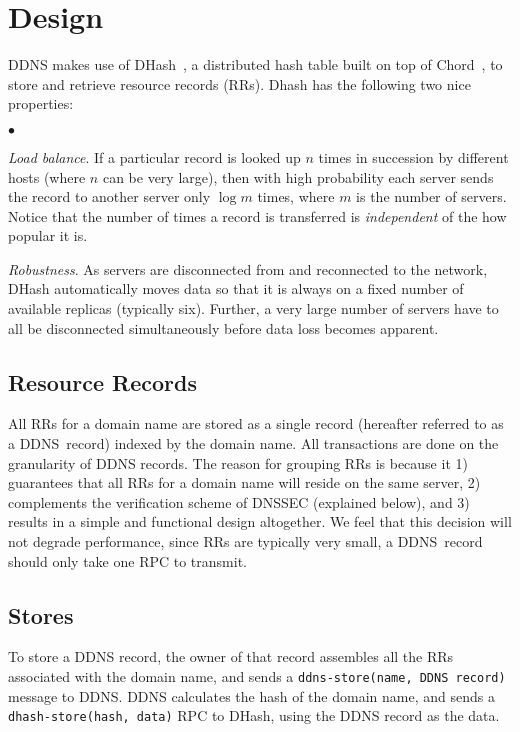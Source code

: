 \section{Design}

DDNS makes use of
DHash~\cite{cfs:sosp01}, a distributed hash table
built on top of Chord~\cite{chord:sigcomm}, to store
and retrieve resource records (RRs).
Dhash has the following two nice properties:

\begin{list}{$\bullet$}{}
\item {\em Load balance}.
If a particular record is looked up $n$ times
in succession by different hosts (where $n$ can be very large),
then with high probability each server sends
the record to another server only $\log{m}$ times, 
where $m$ is the number of servers. Notice that
the number of times a record is transferred is 
{\it independent} of the how popular it is.

\item {\em Robustness}.
As servers are disconnected from and reconnected to the network,
DHash automatically moves data so that it is always on a fixed
number of available replicas (typically six).
Further, a very large number of servers have to
all be disconnected simultaneously before data loss
becomes apparent.
\end{list}

\subsection{Resource Records}

All RRs for a domain name are stored 
as a single record (hereafter referred to as a DDNS~record) 
indexed by the domain name.
All transactions are done on the granularity
of DDNS records. The reason for grouping RRs is because it 1)
guarantees that all RRs for a domain name will reside on
the same server, 2) complements the verification scheme
of DNSSEC (explained below), and 3) results in a simple
and functional design altogether. We feel that this decision 
will not degrade performance, since RRs are typically 
very small, a DDNS~record should only take one RPC to transmit.

\subsection{Stores}

To store a DDNS record, the owner of that record 
assembles all the RRs associated with the domain name,
and sends a {\tt ddns-store(name, DDNS~record)} message to DDNS. 
DDNS calculates the hash of the domain name, and sends
a {\tt dhash-store(hash, data)} RPC to DHash, using the
DDNS record as the data.

